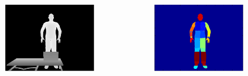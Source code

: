 \documentclass[xcolor=dvipsnames]{beamer}
\begin{document}
\begin{frame}
\begin{columns}
\begin{column}{.33\textwidth}
		\end{column}
		\begin{column}{.33\textwidth}
			\begin{figure}
				\includegraphics[width=\textwidth]{img/oarf2.png}
			\end{figure}
		\end{column}
		\begin{column}{.33\textwidth}
			\begin{figure}
				\includegraphics[width=\textwidth]{img/oarf3.png}
			\end{figure}
		\end{column}
	\end{columns}
\end{frame}
\end{document}
